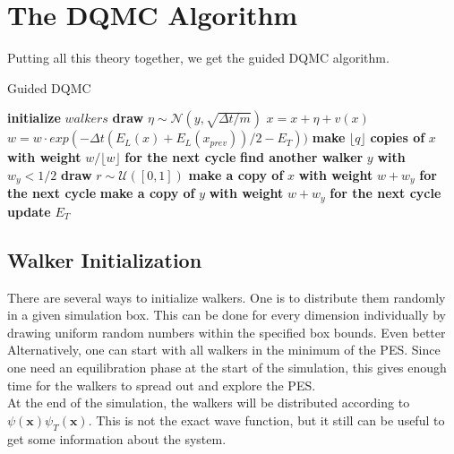\documentclass [12pt]{report}
\begin{document}
\section{The DQMC Algorithm}
Putting all this theory together, we get the guided DQMC algorithm.

\begin{algorithm}
\caption{Guided DQMC}\label{dqmc}
\begin{algorithmic}[1]
\State \textbf{initialize} $walkers$
		\State \textbf{draw} $\eta \sim \mathcal{N}(y,\sqrt{\Delta t/m})$
		\State $x = x + \eta + v(x)$ 
		\State $w = w \cdot exp(-\Delta t (E_L(x)+E_L(x_{prev}))/2 - E_T))$
		\State \textbf{make} $\lfloor q \rfloor$ \textbf{copies of} $x$ \textbf{with weight} $w/\lfloor w \rfloor$ \textbf{for the next cycle}
		\EndIf
		\State \textbf{find another walker} $y$ \textbf{with} $w_y < 1/2$
		\State \textbf{draw} $r \sim \mathcal{U}([0,1])$
		\State \textbf{make a copy of} $x$ \textbf{with weight} $w+w_y$ \textbf{for the next cycle}
		\Else
		\State \textbf{make a copy of} $y$ \textbf{with weight} $w+w_y$ \textbf{for the next cycle}
		\EndIf
		\EndIf 
	\EndFor
	\State \textbf{update} $E_T$ 
\EndFor 
\EndProcedure
\end{algorithmic}
\end{algorithm}
\subsection{Walker Initialization}
There are several ways to initialize walkers. One is to distribute them randomly in a given simulation box. This can be done for every dimension individually by drawing uniform random numbers within the specified box bounds. Even better  Alternatively, one can start with all walkers in the minimum of the PES. Since one need an equilibration phase at the start of the simulation, this gives enough time for the walkers to spread out and explore the PES.\\ 
At the end of the simulation, the walkers will be distributed according to $\psi(\bm{x})\psi_T(\bm{x})$. This is not the exact wave function, but it still can be useful to get some information about the system.
\end{document}
